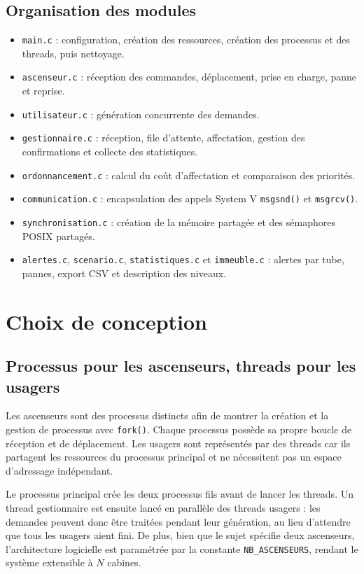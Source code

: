\documentclass[11pt,a4paper]{article}
\begin{document}
\subsection{Organisation des modules}

\begin{itemize}
  \item \texttt{main.c} : configuration, création des ressources, création des processus et des threads, puis nettoyage.
  \item \texttt{ascenseur.c} : réception des commandes, déplacement, prise en charge, panne et reprise.
  \item \texttt{utilisateur.c} : génération concurrente des demandes.
  \item \texttt{gestionnaire.c} : réception, file d'attente, affectation, gestion des confirmations et collecte des statistiques.
  \item \texttt{ordonnancement.c} : calcul du coût d'affectation et comparaison des priorités.
  \item \texttt{communication.c} : encapsulation des appels System V \texttt{msgsnd()} et \texttt{msgrcv()}.
  \item \texttt{synchronisation.c} : création de la mémoire partagée et des sémaphores POSIX partagés.
  \item \texttt{alertes.c}, \texttt{scenario.c}, \texttt{statistiques.c} et \texttt{immeuble.c} : alertes par tube, pannes, export CSV et description des niveaux.
\end{itemize}

\newpage
\section{Choix de conception}

\subsection{Processus pour les ascenseurs, threads pour les usagers}

Les ascenseurs sont des processus distincts afin de montrer la création et la gestion de processus avec \texttt{fork()}. Chaque processus possède sa propre boucle de réception et de déplacement. Les usagers sont représentés par des threads car ils partagent les ressources du processus principal et ne nécessitent pas un espace d'adressage indépendant.

Le processus principal crée les deux processus fils avant de lancer les threads. Un thread gestionnaire est ensuite lancé en parallèle des threads usagers : les demandes peuvent donc être traitées pendant leur génération, au lieu d'attendre que tous les usagers aient fini. De plus, bien que le sujet spécifie deux ascenseurs, l'architecture logicielle est paramétrée par la constante \texttt{NB\_ASCENSEURS}, rendant le système extensible à $N$ cabines.
\end{document}
